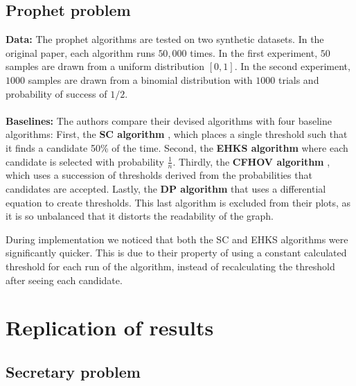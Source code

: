 \subsection{Prophet problem}
\textbf{Data:} 
The prophet algorithms are tested on two synthetic datasets. In the original paper, each algorithm runs $50,000$ times. In the first experiment, $50$ samples are drawn from a uniform distribution $[0,1]$. In the second experiment, $1000$ samples are drawn from a binomial distribution with $1000$ trials and probability of success of $1/2$.
\\ \\
\textbf{Baselines:}
The authors compare their devised algorithms with four baseline algorithms: First, the \textbf{SC algorithm} \citet{SamualCahn1984}, which places a single threshold such that it finds a candidate 50\% of the time. Second, the \textbf{EHKS algorithm }\citet{Ehsani2017} where each candidate is selected with probability $\frac{1}{n}$. Thirdly,  the \textbf{CFHOV algorithm} \citet{correa21b}, which uses a succession of thresholds derived from the probabilities that  candidates are accepted. Lastly, the \textbf{DP algorithm} \citet{Chow1971} that uses a differential equation to create thresholds. This last algorithm is excluded from their plots, as it is so unbalanced that it distorts the readability of the graph.

During implementation we noticed that both the SC and EHKS algorithms were significantly quicker. This is due to their property of using a constant calculated threshold for each run of the algorithm, instead of recalculating the threshold after seeing each candidate.

\section{Replication of results}

\subsection{Secretary problem}

